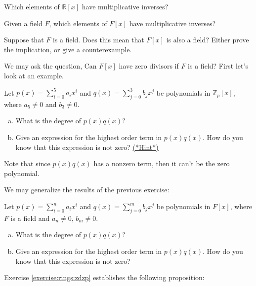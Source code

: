 \begin{exercise}
Which elements of $\mathbb{R}[x]$ have multiplicative inverses?
\end{exercise}


\begin{exercise}
Given a field $F$, which elements of $F[x]$ have multiplicative inverses?
\end{exercise}

\begin{exercise}\label{exercise:rings:fieldexercise}
Suppose that $F$ is a field. Does this mean that $F[x]$ is also a field? Either prove the implication, or give a counterexample.
\end{exercise}

We may ask the question, Can $F[x]$ have zero divisors if $F$ is a field? First let's look at an example.

\begin{exercise}\label{exercise:rings:zdzp}
Let $p(x)=\sum_{i=0}^{5} a_ix^i$ and $q(x)=\sum_{j=0}^{3} b_jx^j$ be polynomials in $\mathbb{Z}_p[x]$, where $a_5\neq 0$ and $b_3\neq 0$.
\begin{enumerate}[(a)]
\item
What is the degree of $p(x)q(x)$?
\item
Give an expression for the highest order term in $p(x)q(x)$. How do you know that this expression is not zero? \hyperref[ringsHints]{(*Hint*)} 
\end{enumerate}
Note that since $p(x)q(x)$ has a nonzero term, then it can't be the zero polynomial.
\end{exercise}

\noindent
We may generalize the results of the previous exercise:

\begin{exercise}\label{exercise:rings:zdzp}
Let $p(x)=\sum_{i=0}^{n} a_ix^i$ and $q(x)=\sum_{j=0}^{m} b_jx^j$ be polynomials in $F[x]$, where $F$ is a field and $a_n\neq 0$, $b_m\neq 0$.
\begin{enumerate}[(a)]
\item
What is the degree of $p(x)q(x)$?
\item
Give an expression for the highest order term in $p(x)q(x)$. How do you know that this expression is not zero? 
\end{enumerate}
\end{exercise}

Exercise \ref{exercise:rings:zdzp} establishes the following proposition: 

